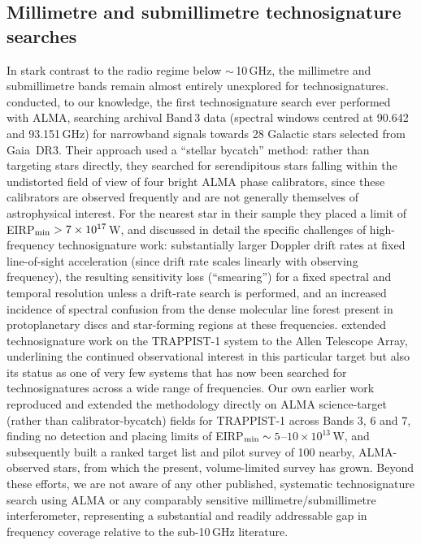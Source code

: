 \documentclass{openjournal}
\begin{document}
\subsection{Millimetre and submillimetre technosignature searches}
\label{sec:mmsubmm}

In stark contrast to the radio regime below $\sim$\,10\,GHz, the millimetre and
submillimetre bands remain almost entirely unexplored for technosignatures.
\citet{Mason2024} conducted, to our knowledge, the first technosignature search
ever performed with ALMA, searching archival Band\,3 data (spectral windows
centred at 90.642 and 93.151\,GHz) for narrowband signals towards 28 Galactic
stars selected from Gaia~DR3. Their approach used a ``stellar bycatch'' method:
rather than targeting stars directly, they searched for serendipitous stars
falling within the undistorted field of view of four bright ALMA phase
calibrators, since these calibrators are observed frequently and are not
generally themselves of astrophysical interest. For the nearest star in their
sample they placed a limit of EIRP$_{\rm min} > 7\times10^{17}$\,W, and discussed
in detail the specific challenges of high-frequency technosignature work:
substantially larger Doppler drift rates at fixed line-of-sight acceleration
(since drift rate scales linearly with observing frequency), the resulting
sensitivity loss (``smearing'') for a fixed spectral and temporal resolution
unless a drift-rate search is performed, and an increased incidence of spectral
confusion from the dense molecular line forest present in protoplanetary discs
and star-forming regions at these frequencies. \citet{ATATRAPPIST2024} extended
technosignature work on the TRAPPIST-1 system to the Allen Telescope Array,
underlining the continued observational interest in this particular target but
also its status as one of very few systems that has now been searched for
technosignatures across a wide range of frequencies. Our own earlier work \citep{White2026} reproduced and extended the
\citet{Mason2024} methodology directly on ALMA science-target (rather than
calibrator-bycatch) fields for TRAPPIST-1 across Bands 3, 6 and 7, finding no
detection and placing limits of EIRP$_{\rm min}\sim5$--$10\times10^{13}$\,W, and
subsequently built a ranked target list and pilot survey of 100 nearby,
ALMA-observed stars, from which the present, volume-limited survey has grown.
Beyond these efforts, we are not aware of any other published, systematic
technosignature search using ALMA or any comparably sensitive
millimetre/submillimetre interferometer, representing a substantial and readily
addressable gap in frequency coverage relative to the sub-10\,GHz literature.
\end{document}
